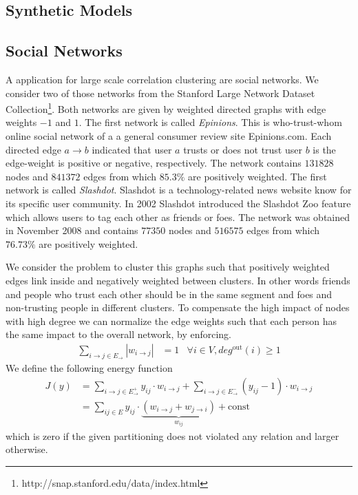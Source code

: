 \documentclass[10pt,twocolumn,letterpaper]{article}
\begin{document}
\subsection{Synthetic Models}

\subsection{Social Networks}
A application for large scale correlation clustering are social networks.
We consider two of those networks from the Stanford Large Network Dataset Collection\footnote{http://snap.stanford.edu/data/index.html}.
Both networks are given by weighted directed graphs with edge weights $-1$ and $1$. 
%
The first network is called \emph{Epinions}. 
This is who-trust-whom online social network of a a general consumer review site Epinions.com. 
Each directed edge $a\to b$ indicated that user $a$ trusts  or does not trust user $b$ is the edge-weight is positive or negative, respectively.
The network contains $131828$ nodes and $841372$ edges from which $85.3\%$ are positively weighted.
%
The first network is called \emph{Slashdot}. 
Slashdot is a technology-related news website know for its specific user community. 
In 2002 Slashdot introduced the Slashdot Zoo feature which allows users to tag each other as friends or foes. 
The network was obtained in November 2008 and contains $77350$ nodes and $516575$ edges from which $76.73\%$ are positively weighted.

We consider the problem to cluster this graphs such that positively weighted edges link inside and negatively weighted between clusters.
In other words friends and people who trust each other should be in the same segment and foes and non-trusting people in different clusters.
% 
To compensate the high impact of nodes with high degree we can normalize the edge weights such that each person has the same impact to the overall network, by enforcing.
\begin{align}
  \sum_{i\to j \in E_{\to}} |w_{i\to j}| &= 1&\forall i\in V, deg^{\textrm{out}}(i)\geq 1 
\end{align}
We define the following energy function
\begin{align}
 J(y) &= \sum_{i\to j \in E^+_{\to}} y_{ij}\cdot w_{i \to j} +  \sum_{i\to j \in E^-_{\to}} (y_{ij}-1)\cdot w_{i \to j} \nonumber\\
      &= \sum_{ij \in E} y_{ij}\cdot \underbrace{(w_{i \to j}+w_{j \to i})}_{w_{ij}} + \textrm{const}
\end{align}
which is zero if the given partitioning does not violated any relation and larger otherwise.
\end{document}
